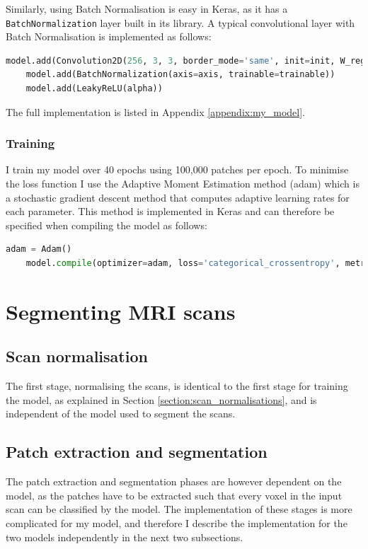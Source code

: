 \documentclass[12pt,a4paper,twoside,openright]{report}
\begin{document}
Similarly, using Batch Normalisation is easy in Keras, as it has a \texttt{BatchNormalization} layer built in its library. A typical convolutional layer with Batch Normalisation is implemented as follows:
\begin{lstlisting}[language=Python]
	model.add(Convolution2D(256, 3, 3, border_mode='same', init=init, W_regularizer=l2(l)))
	model.add(BatchNormalization(axis=axis, trainable=trainable))
	model.add(LeakyReLU(alpha))
\end{lstlisting}

The full implementation is listed in Appendix \ref{appendix:my_model}.

\subsubsection{Training}
I train my model over 40 epochs using 100,000 patches per epoch. To minimise the loss function I use the Adaptive Moment Estimation method (adam) \cite{adam} which is a stochastic gradient descent method that computes adaptive learning rates for each parameter. This method is implemented in Keras and can therefore be specified when compiling the model as follows:
\begin{lstlisting}[language=Python]
	adam = Adam()
    model.compile(optimizer=adam, loss='categorical_crossentropy', metrics=['accuracy'])
\end{lstlisting}

\section{Segmenting MRI scans}
\subsection{Scan normalisation}
The first stage, normalising the scans, is identical to the first stage for training the model, as explained in Section \ref{section:scan_normalisations}, and is independent of the model used to segment the scans.

\subsection{Patch extraction and segmentation}
The patch extraction and segmentation phases are however dependent on the model, as the patches have to be extracted such that every voxel in the input scan can be classified by the model. The implementation of these stages is more complicated for my model, and therefore I describe the implementation for the two models independently in the next two subsections.
\end{document}
